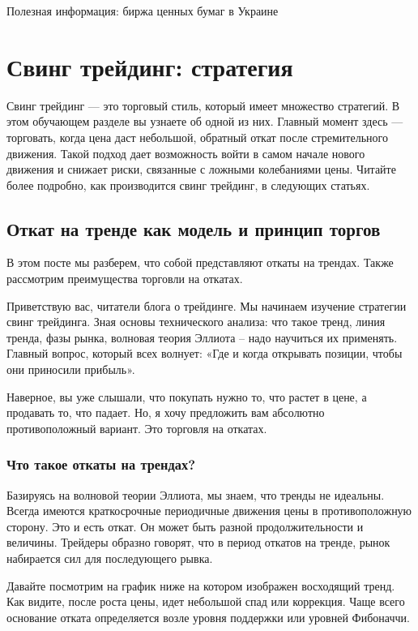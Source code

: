 \documentclass{book}
\begin{document}
Полезная информация: биржа ценных бумаг в Украине

\section{Свинг трейдинг: стратегия}

Свинг трейдинг — это торговый стиль, который имеет множество стратегий. В этом обучающем разделе вы узнаете об одной из них. Главный момент здесь — торговать, когда цена даст небольшой, обратный откат после стремительного движения. Такой подход дает возможность войти в самом начале нового движения и снижает риски, связанные с ложными колебаниями цены. Читайте более подробно, как производится свинг трейдинг, в следующих статьях.

\subsection{Откат на тренде как модель и принцип торгов}

В этом посте мы разберем, что собой представляют откаты на трендах. Также рассмотрим преимущества торговли на откатах.

Приветствую вас, читатели блога о трейдинге. Мы начинаем изучение стратегии свинг трейдинга. Зная основы технического анализа: что такое тренд, линия тренда, фазы рынка, волновая теория Эллиота – надо научиться их применять. Главный вопрос, который всех волнует: «Где и когда открывать позиции, чтобы они приносили прибыль».

Наверное, вы уже слышали, что покупать нужно то, что растет в цене, а
продавать то, что падает. Но, я хочу предложить вам абсолютно
противоположный вариант. Это торговля на откатах.

\subsubsection{Что такое откаты на трендах?}

Базируясь на волновой теории Эллиота, мы знаем, что тренды не идеальны. Всегда имеются краткосрочные периодичные движения цены в противоположную сторону. Это и есть откат. Он может быть разной продолжительности и величины. Трейдеры образно говорят, что в период откатов на тренде, рынок набирается сил для последующего рывка.

Давайте посмотрим на график ниже на котором изображен восходящий тренд. Как видите, после роста цены, идет небольшой спад или коррекция. Чаще всего основание отката определяется возле уровня поддержки или уровней Фибоначчи.
\end{document}
